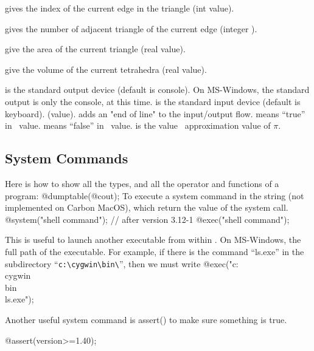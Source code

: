 \documentclass[a4paper,twoside,12pt]{book}
\def\x#1{#1\index{#1}}%
\begin{document}
\begin{description}
    \itemtt[nuEdge]  gives the index of the current edge in the triangle (int value).

    \itemtt[nTonEdge] gives the number of adjacent triangle of the current
    edge (integer ).

    \itemtt[area] give the area of the current triangle (real value). 

    \itemtt[volume] give the volume of the current tetrahedra (real value). 

\itemtt[cout]  is the standard output device (default is console).
On MS-Windows, the standard output is only the console, at this time.
  \Ostream {}
\itemtt[cin]  is the standard input device (default is keyboard). (\Istream value). 
\itemtt[endl] adds an "end of line" to the input/output flow.
\itemtt[true]   means ``true'' in  \Bool\  value. 
\itemtt[false]  means ``false'' in  \Bool\ value. 
\itemtt[pi]   is the \Real value  ~approximation value of $\pi$.
\end{description}

\subsection{System Commands}

Here is how to show all the types, and all the operator and functions of a \freefempp program:
\bFF
 @dumptable(@cout);
\eFF {}
To execute a system command in the string (not implemented on Carbon MacOS), which  return 
the value of the system call. 
\bFF
  @system("shell command"); // after version 3.12-1
  @exec("shell command");  
  
\eFF
This is useful to launch another executable from within \freefempp.
On MS-Windows, the full path of the executable. For example, if there is the command
``ls.exe'' in the subdirectory ``\verb|c:\cygwin\bin\|'', then we must write
\bFF
  @exec("c:\\cygwin\\bin\\ls.exe");
\eFF
{}

Another useful system command is \x{assert()} to make sure something is true.

\bFF
@assert(version>=1.40);
\eFF
\end{document}
